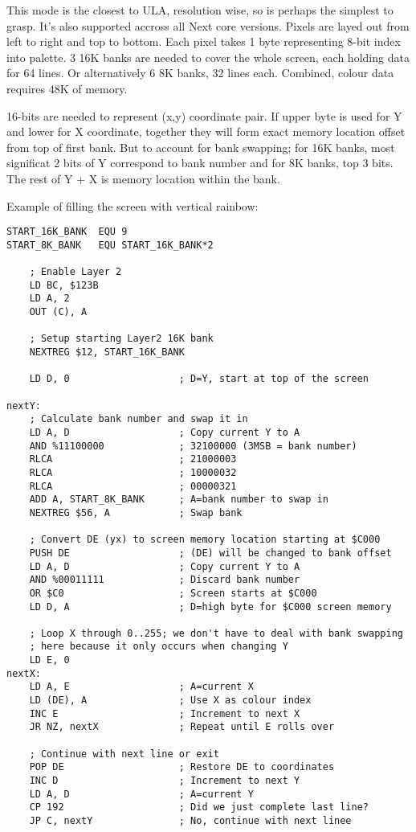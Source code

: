 \documentclass[12pt,twoside,openright,a4paper]{book}
\begin{document}
This mode is the closest to ULA, resolution wise, so is perhaps the simplest to grasp. It's also supported accross all Next core versions. Pixels are layed out from left to right and top to bottom. Each pixel takes 1 byte representing 8-bit index into palette. 3 16K banks are needed to cover the whole screen, each holding data for 64 lines. Or alternatively 6 8K banks, 32 lines each. Combined, colour data requires 48K of memory.

16-bits are needed to represent (x,y) coordinate pair. If upper byte is used for Y and lower for X coordinate, together they will form exact memory location offset from top of first bank. But to account for bank swapping; for 16K banks, most significat 2 bits of Y correspond to bank number and for 8K banks, top 3 bits. The rest of Y + X is memory location within the bank.

Example of filling the screen with vertical rainbow:

\begin{lstlisting}
START_16K_BANK  EQU 9
START_8K_BANK   EQU START_16K_BANK*2

	; Enable Layer 2
	LD BC, $123B
	LD A, 2
	OUT (C), A
    
    ; Setup starting Layer2 16K bank
    NEXTREG $12, START_16K_BANK
    
    LD D, 0                   ; D=Y, start at top of the screen
    
nextY:
    ; Calculate bank number and swap it in
    LD A, D                   ; Copy current Y to A
    AND %11100000             ; 32100000 (3MSB = bank number)
    RLCA                      ; 21000003
    RLCA                      ; 10000032
    RLCA                      ; 00000321
    ADD A, START_8K_BANK      ; A=bank number to swap in
    NEXTREG $56, A            ; Swap bank
    
    ; Convert DE (yx) to screen memory location starting at $C000
    PUSH DE                   ; (DE) will be changed to bank offset
    LD A, D                   ; Copy current Y to A
    AND %00011111             ; Discard bank number
    OR $C0                    ; Screen starts at $C000
    LD D, A                   ; D=high byte for $C000 screen memory

    ; Loop X through 0..255; we don't have to deal with bank swapping
    ; here because it only occurs when changing Y
    LD E, 0
nextX:
    LD A, E                   ; A=current X
    LD (DE), A                ; Use X as colour index
    INC E                     ; Increment to next X
    JR NZ, nextX              ; Repeat until E rolls over
    
    ; Continue with next line or exit
    POP DE                    ; Restore DE to coordinates
    INC D                     ; Increment to next Y
    LD A, D                   ; A=current Y
    CP 192                    ; Did we just complete last line?
    JP C, nextY               ; No, continue with next linee
\end{lstlisting}
\end{document}
